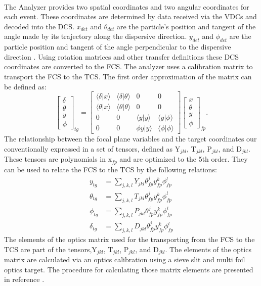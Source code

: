 \paragraph{} The Analyzer provides two spatial coordinates and two angular coordinates for each event. These coordinates are determined by data received via the VDCs and decoded into the DCS. $x_{det}$ and $\theta_{det}$ are the particle's position and tangent of the angle made by its trajectory along the dispersive direction. $y_{det}$ and $\phi_{det}$ are the particle position and tangent of the angle perpendicular to the dispersive direction \cite{optics}. Using rotation matrices and other transfer definitions these DCS coordinates are converted to the FCS. The analyzer uses a calibration matrix to transport the FCS to the TCS. The first order approximation of the matrix can be defined as:
\begin{equation}
\begin{bmatrix}
	\delta \\
	\theta \\
	y      \\
	\phi   
\end{bmatrix}_{tg}
=
\begin{bmatrix}
	\langle \delta \vert x \rangle &\langle \delta \vert \theta \rangle & 0 & 0\\
	\langle \theta \vert x \rangle &\langle \theta \vert \theta \rangle & 0 & 0\\
	0 & 0 & \langle y \vert y \rangle &\langle y \vert \phi \rangle\\
	0 & 0 & \phi y \vert y \rangle &\langle \phi \vert \phi \rangle
\end{bmatrix}
\begin{bmatrix}
	x     \\    
	\theta \\
	y      \\
	\phi   
\end{bmatrix}_{fp}.
\end{equation}
The relationship between the focal plane variables and the target coordinates our conventionally expressed in a set of tensors, defined as Y$_{jkl}$, T$_{jkl}$, P$_{jkl}$, and D$_{jkl}$. These tensors are polynomials in x$_{fp}$ and are optimized to the 5th order. They can be used to relate the FCS to the TCS by the following relations:
\begin{align}
y_{tg} &= \sum_{j,k,l} Y_{jkl}\theta^j_{fp}y^k_{fp}\phi^l_{fp} \\
\theta_{tg} &= \sum_{j,k,l} T_{jkl}\theta^j_{fp}y^k_{fp}\phi^l_{fp} \\
\phi_{tg} &= \sum_{j,k,l} P_{jkl}\theta^j_{fp}y^k_{fp}\phi^l_{fp}  \\
\delta_{tg} &= \sum_{j,k,l} D_{jkl}\theta^j_{fp}y^k_{fp}\phi^l_{fp} 
\end{align}
The elements of the optics matrix used for the transporting from the FCS to the TCS are part of the tensors,Y$_{jkl}$, T$_{jkl}$, P$_{jkl}$, and D$_{jkl}$. The elements of the optics matrix are calculated via an optics calibration using a sieve slit and multi foil optics target. The procedure for calculating those matrix elements are presented in reference \cite{optics}. 
